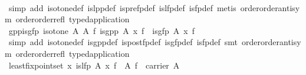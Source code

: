 \begin{isabellebody}
%
\isadelimproof
\ \ %
\endisadelimproof
%
\isatagproof
{}\isamarkupfalse%
\ {}simp\ add{}\ isotone{}def\ is{}lpp{}def\ is{}pre{}fp{}def\ is{}lfp{}def\ is{}fp{}def{}\ metis\ order{}order{}antisym\ order{}order{}refl\ typed{}application{}%
\endisatagproof
{\isafoldproof}%
%
\isadelimproof
\isanewline
%
\endisadelimproof
\isanewline
{}\isamarkupfalse%
\ gpp{}is{}gfp{}\ {}{}isotone\ A\ A\ f{}\ is{}gpp\ A\ x\ f{}\ {}\ is{}gfp\ A\ x\ f{}\isanewline
%
\isadelimproof
\ \ %
\endisadelimproof
%
\isatagproof
{}\isamarkupfalse%
\ {}simp\ add{}\ isotone{}def\ is{}gpp{}def\ is{}post{}fp{}def\ is{}gfp{}def\ is{}fp{}def{}\ smt\ order{}order{}antisym\ order{}order{}refl\ typed{}application{}%
\endisatagproof
{\isafoldproof}%
%
\isadelimproof
\isanewline
%
\endisadelimproof
\isanewline
{}\isamarkupfalse%
\ least{}fixpoint{}set{}\ {}{}{}x{}\ is{}lfp\ A\ x\ f{}\ {}\ {}\isactrlbsub A\isactrlesub \ f\ {}\ carrier\ A{}\isanewline

\end{isabellebody}
